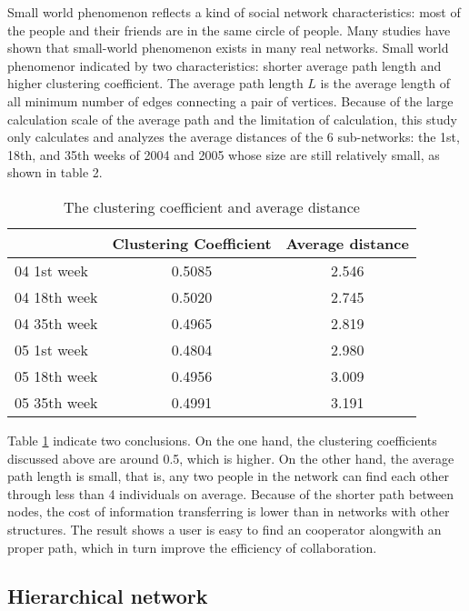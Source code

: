\documentclass{elsarticle}
\begin{document}
Small world phenomenon reflects a kind of social network
characteristics: most of the people and their friends are in the same
circle of people. Many studies have shown that small-world phenomenon
exists in many real networks. Small world phenomenor indicated by two
characteristics: shorter average path length and higher clustering
coefficient. The average path length $L$ is the average length of
all minimum number of edges connecting a pair of vertices. Because of
the large calculation scale of the average path and the limitation of
calculation, this study only calculates and analyzes the average
distances of the 6 sub-networks: the 1st, 18th, and 35th weeks of
2004 and 2005 whose size are still relatively small, as shown in table
2.

\begin{table}[htpb]
  \centering
 \caption{The clustering coefficient and average distance} 
 \begin{tabular}{lcc}
   \toprule
    &Clustering Coefficient&Average distance\\\hline
  04 1st week&0.5085&2.546\\
  04 18th week&0.5020&2.745\\
  04 35th week&0.4965&2.819\\
  05 1st week&0.4804&2.980\\
  05 18th week&0.4956&3.009\\
  05 35th week&0.4991&3.191\\\bottomrule
   \end{tabular}
 \label{tab:small-world}
\end{table}

Table \ref{tab:small-world} indicate two conclusions. On the one hand, the
clustering coefficients discussed above are around 0.5, which is higher. On the other
hand, the average path length is small, that is, any two people
in the network can find each other through less than 4 individuals on
average. Because of the shorter path between nodes, the cost of
information transferring is lower than in
networks with other structures. The result shows a user is easy to find an cooperator
alongwith an proper path, which in turn improve the efficiency of collaboration.



 \subsection{Hierarchical network}
\label{sec:hierarchical-network}
\end{document}
